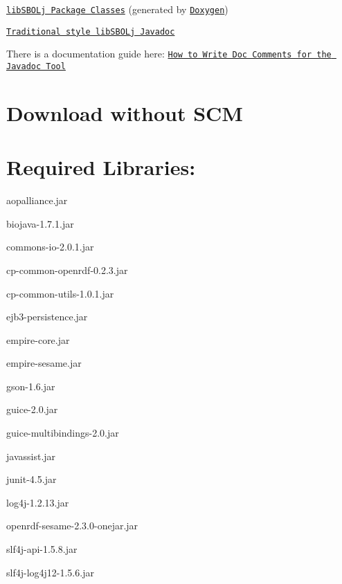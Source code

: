 \begin{DoxyItemize}
\item \href{annotated.html}{\tt libSBOLj Package Classes} (generated by \href{http://www.stack.nl/~dimitri/doxygen/}{\tt Doxygen})
\item \href{../../../documentation/classic_javadoc/index.html}{\tt Traditional style libSBOLj Javadoc}
\item There is a documentation guide here: \href{http://www.oracle.com/technetwork/java/javase/documentation/index-137868.html}{\tt How to Write Doc Comments for the Javadoc Tool}
\end{DoxyItemize}\hypertarget{devnotes_sec_dl}{}\section{Download without SCM}\label{devnotes_sec_dl}
\hypertarget{devnotes_sec_libs}{}\section{Required Libraries:}\label{devnotes_sec_libs}

\begin{DoxyItemize}
\item aopalliance.jar
\item biojava-\/1.7.1.jar
\item commons-\/io-\/2.0.1.jar
\item cp-\/common-\/openrdf-\/0.2.3.jar
\item cp-\/common-\/utils-\/1.0.1.jar
\item ejb3-\/persistence.jar
\item empire-\/core.jar
\item empire-\/sesame.jar
\item gson-\/1.6.jar
\item guice-\/2.0.jar
\item guice-\/multibindings-\/2.0.jar
\item javassist.jar
\item junit-\/4.5.jar
\item log4j-\/1.2.13.jar
\item openrdf-\/sesame-\/2.3.0-\/onejar.jar
\item slf4j-\/api-\/1.5.8.jar
\item slf4j-\/log4j12-\/1.5.6.jar 
\end{DoxyItemize}
